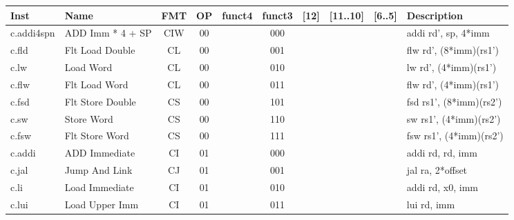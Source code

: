 \begin{center}
\begin{tabular}
{T | l | c | c | c | c | c | c | c | T } \hline
\rm Inst   & Name                    & FMT & \rm OP & \rm funct4 & \rm funct3 & \rm [12] & \rm [11..10] & \rm [6..5] & \rm Description          \\ \hline
c.addi4spn & ADD Imm * 4 + SP        & CIW & 00     & & 000 & & &       & addi rd', sp, 4*imm      \\
c.fld      & Flt Load Double         & CL  & 00     & & 001 & & &       & flw rd', (8*imm)(rs1')   \\
c.lw       & Load Word               & CL  & 00     & & 010 & & &       & lw rd', (4*imm)(rs1')    \\
c.flw      & Flt Load Word           & CL  & 00     & & 011 & & &       & flw rd', (4*imm)(rs1')   \\
c.fsd      & Flt Store Double        & CS  & 00     & & 101 & & &       & fsd rs1', (8*imm)(rs2')  \\
c.sw       & Store Word              & CS  & 00     & & 110 & & &       & sw rs1', (4*imm)(rs2')    \\
c.fsw      & Flt Store Word          & CS  & 00     & & 111 & & &       & fsw rs1', (4*imm)(rs2')  \\
\hline
c.addi     & ADD Immediate           & CI  & 01     & & 000 & & &       & addi rd, rd, imm         \\
c.jal      & Jump And Link           & CJ  & 01     & & 001 & & &       & jal ra, 2*offset         \\
c.li       & Load Immediate          & CI  & 01     & & 010 & & &       & addi rd, x0, imm         \\
c.lui      & Load Upper Imm          & CI  & 01     & & 011 & & &       & lui rd, imm              \\

\end{tabular}
\end{center}
